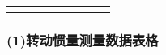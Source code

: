 \begin{center}
\begin{tabular}{|c|c|c|c|c|c|c|c|}
{%


\end{tabular}
\end{center}
\subsubsection*{(1)转动惯量测量数据表格}
